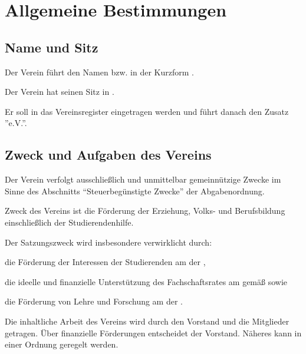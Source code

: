 \chapter{Allgemeine Bestimmungen}
\label{sec:Allg_Bestimmung}


\section{Name und Sitz}
	\begin{absätze}
		\item Der Verein führt den Namen \textit{\Vereinsname{}} bzw. in der Kurzform \textit{\VereinsnameKurz{}}.
		\item Der Verein hat seinen Sitz in \Stadt{}.
		\item Er soll in das Vereinsregister eingetragen werden und führt danach den Zusatz ''e.V.''.
	\end{absätze}

\section{Zweck und Aufgaben des Vereins}
	\begin{absätze}
		\item Der Verein verfolgt ausschließlich und unmittelbar gemeinnützige Zwecke im Sinne des Abschnitts "`Steuerbegünstigte Zwecke"' der Abgabenordnung.
		\item Zweck des Vereins ist die Förderung der Erziehung, Volks- und Berufsbildung einschließlich der Studierendenhilfe.
		\item Der Satzungszweck wird insbesondere verwirklicht durch:
		\begin{sätze}
			\item die Förderung der Interessen der Studierenden am \Fachbereich{} der \Uni{},
			\item die ideelle und finanzielle Unterstützung des Fachschaftsrates am \Fachbereich{} gemäß \VerweisFachschaftsrat{} sowie
			\item die Förderung von Lehre und Forschung am \Fachbereich{} der \Uni{}.
		\end{sätze}
		\item Die inhaltliche Arbeit des Vereins wird durch den Vorstand und die Mitglieder getragen. Über finanzielle Förderungen entscheidet der Vorstand. Näheres kann in einer Ordnung geregelt werden.
	\end{absätze}

